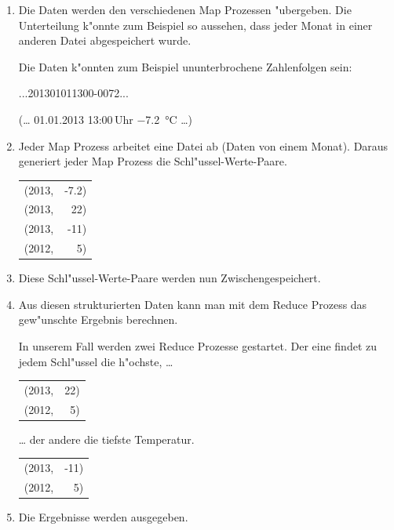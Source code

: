 \begin{refsection}
\begin{beispiel}
  \begin{enumerate}
    \item Die Daten werden den verschiedenen Map Prozessen
      "ubergeben.  Die Unterteilung k"onnte zum Beispiel so aussehen,
      dass jeder Monat in einer anderen Datei abgespeichert wurde.

      Die Daten k"onnten zum Beispiel ununterbrochene Zahlenfolgen
      sein:
      \begin{center}
        ...201301011300-0072...
      \end{center}
      (\dots{} 01.01.2013 13:00\,Uhr \SI{-7.2}{\degreeCelsius} \dots{})
    \item Jeder Map Prozess arbeitet eine Datei ab (Daten von einem
      Monat).  Daraus generiert jeder Map Prozess die
      Schl"ussel-Werte-Paare.
      \begin{center}
      \begin{tabular}{lr}
        (2013, &-7.2)\\
        (2013, &22)\\
        (2013, &-11)\\
        (2012, &5)
      \end{tabular}
      \end{center}

    \item Diese Schl"ussel-Werte-Paare werden nun
      Zwischengespeichert.

    \item Aus diesen strukturierten Daten kann man mit dem Reduce
      Prozess das gew"unschte Ergebnis berechnen.

      In unserem Fall werden zwei Reduce Prozesse gestartet.  Der eine
      findet zu jedem Schl"ussel die h"ochste, \dots{}
      \begin{center}
      \begin{tabular}{lr}
        (2013, &22)\\
        (2012, &5)
      \end{tabular}
      \end{center}
      \dots{} der andere die tiefste Temperatur.
      \begin{center}
      \begin{tabular}{lr}
        (2013, &-11)\\
        (2012, &5)
      \end{tabular}
      \end{center}
    \item Die Ergebnisse werden ausgegeben.
  \end{enumerate}


\end{beispiel}
\end{refsection}
